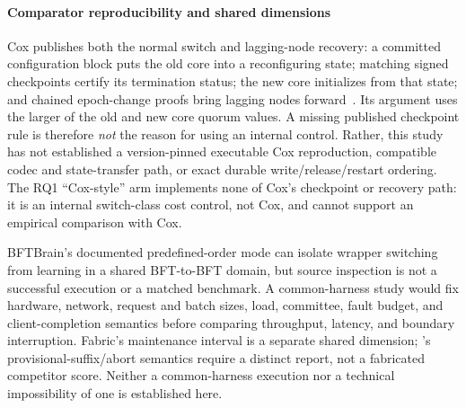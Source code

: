 \paragraph{Comparator reproducibility and shared dimensions}
Cox publishes both the normal switch and lagging-node recovery: a committed configuration block
puts the old core into a reconfiguring state; matching signed checkpoints certify its termination
status; the new core initializes from that state; and chained epoch-change proofs bring lagging
nodes forward~\cite[Sections~4.2--4.3 and 5.2]{cox}. Its argument uses the larger of the old
and new core quorum values. A missing published checkpoint rule is therefore \emph{not} the reason
for using an internal control. Rather, this study has not established a version-pinned executable
Cox reproduction, compatible codec and state-transfer path, or exact durable
write/release/restart ordering. The RQ1 ``Cox-style'' arm implements none of Cox's checkpoint or
recovery path: it is an internal switch-class cost control, not Cox, and cannot support an
empirical comparison with Cox.

BFTBrain's documented predefined-order mode can isolate wrapper switching from learning in a
shared BFT-to-BFT domain, but source inspection is not a successful execution or a matched
benchmark. A common-harness study would fix hardware, network, request and batch sizes, load,
committee, fault budget, and client-completion semantics before comparing throughput, latency,
and boundary interruption. Fabric's maintenance interval is a separate shared dimension;
\sage's provisional-suffix/abort semantics require a distinct report, not a fabricated
competitor score. Neither a common-harness execution nor a technical impossibility of one is
established here.

